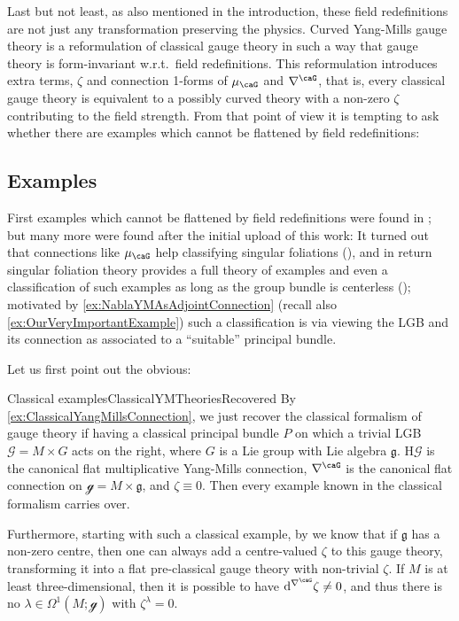 \documentclass[reqno,a4paper,oneside]{amsart}
\newcommand\mutot{\mu_\caG}
\theoremstyle{plain}
\theoremstyle{remark}
\theoremstyle{definition}
\begin{document}
Last but not least, as also mentioned in the introduction, these field redefinitions are not just any transformation preserving the physics. Curved Yang-Mills gauge theory is a reformulation of classical gauge theory in such a way that gauge theory is form-invariant w.r.t.\ field redefinitions. This reformulation introduces extra terms, $\zeta$ and connection 1-forms of $\mutot$ and $\nabla^\caG$, that is, every classical gauge theory is equivalent to a possibly curved theory with a non-zero $\zeta$ contributing to the field strength. From that point of view it is tempting to ask whether there are examples which cannot be flattened by field redefinitions:

\subsection{Examples}\label{CYMExamples}

First examples which cannot be flattened by field redefinitions were found in \cite{My1stpaper, MyThesis}; but many more were found after the initial upload of this work: It turned out that connections like $\mutot$ help classifying singular foliations (\cite{Fischer:2401.05966}), and in return singular foliation theory provides a full theory of examples and even a classification of such examples as long as the group bundle is centerless (\cite[the appendix]{Fischer:2401.05966}); motivated by \ref{ex:NablaYMAsAdjointConnection} (recall also \ref{ex:OurVeryImportantExample}) such a classification is via viewing the LGB and its connection as associated to a ``suitable'' principal bundle.

Let us first point out the obvious:

\begin{examples}{Classical examples}{ClassicalYMTheoriesRecovered}
By \ref{ex:ClassicalYangMillsConnection}, we just recover the classical formalism of gauge theory if having a classical principal bundle $P$ on which a trivial LGB $\mathcal{G} = M \times G$ acts on the right, where $G$ is a Lie group with Lie algebra $\mathfrak{g}$. $\mathrm{H}\mathcal{G}$ is the canonical flat multiplicative Yang-Mills connection, $\nabla^\caG$ is the canonical flat connection on $\mathcal{g} = M \times \mathfrak{g}$, and $\zeta \equiv 0$. Then every example known in the classical formalism carries over.

Furthermore, starting with such a classical example, by \cite[\S 6, Cor.\ 6.2]{My1stpaper} we know that if $\mathfrak{g}$ has a non-zero centre, then one can always add a centre-valued $\zeta$ to this gauge theory, transforming it into a flat pre-classical gauge theory with non-trivial $\zeta$. If $M$ is at least three-dimensional, then it is possible to have $\mathrm{d}^{\nabla^\caG} \zeta \neq 0$, and thus there is no $\lambda \in \Omega^1(M; \mathcal{g})$ with $\zeta^\lambda = 0$.
\end{examples}
\end{document}
